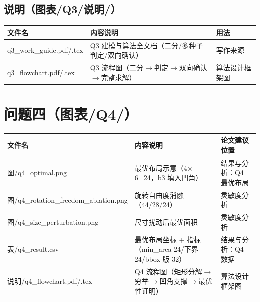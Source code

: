 \documentclass[12pt,a4paper]{article}
\begin{document}
\subsection{说明（图表/Q3/说明/）}

\begin{table}[H]
\centering
\scriptsize
\setlength{\tabcolsep}{1.5pt}
\begin{tabular}{>{\raggedright\arraybackslash}p{4.4cm}>{\raggedright\arraybackslash}p{7.6cm}>{\raggedright\arraybackslash}p{3.4cm}}
\toprule
文件名 & 内容说明 & 用法 \\
\midrule
q3\_\allowbreak{}work\_\allowbreak{}guide.pdf/.tex & Q3 建模与算法全文档（二分/多种子判定/双向确认） & 写作来源 \\
q3\_\allowbreak{}flowchart.pdf/.tex & Q3 流程图（二分$\to$判定$\to$双向确认$\to$完整求解） & 算法设计框架图 \\
\bottomrule
\end{tabular}
\end{table}

\section{问题四（图表/Q4/）}

\begin{table}[H]
\centering
\scriptsize
\setlength{\tabcolsep}{1.5pt}
\begin{tabular}{>{\raggedright\arraybackslash}p{4.4cm}>{\raggedright\arraybackslash}p{7.6cm}>{\raggedright\arraybackslash}p{3.4cm}}
\toprule
文件名 & 内容说明 & 论文建议位置 \\
\midrule
图/q4\_\allowbreak{}optimal.png & 最优布局示意（4$\times$6=24，b3 填入凹角） & 结果与分析：Q4 最优布局 \\
图/q4\_\allowbreak{}rotation\_\allowbreak{}freedom\_\allowbreak{}ablation.png & 旋转自由度消融（44/28/24） & 灵敏度分析 \\
图/q4\_\allowbreak{}size\_\allowbreak{}perturbation.png & 尺寸扰动后最优面积 & 灵敏度分析 \\
表/q4\_\allowbreak{}result.csv & 最优布局坐标 + 指标（min\_\allowbreak{}area 24/下界 24/bbox 版 32） & 结果与分析：Q4 数据 \\
说明/q4\_\allowbreak{}flowchart.pdf/.tex & Q4 流程图（矩形分解$\to$穷举$\to$凹角支撑$\to$最优性证明） & 算法设计框架图 \\
\bottomrule
\end{tabular}
\end{table}
\end{document}
